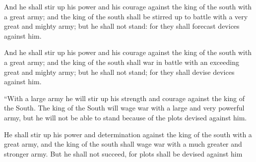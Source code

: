 			And he shall stir up his power and his courage against the king of the south with a great army; and the king of the south shall be stirred up to battle with a very great and mighty army; but he shall not stand: for they shall forecast devices against him.

			\begin{versebox}
					\item[BHS] 
					\item[LXX] 
					\item[ASV] And he shall stir up his power and his courage against the king of the south with a great army; and the king of the south shall war in battle with an exceeding great and mighty army; but he shall not stand; for they shall devise devices against him.
					\item[NIV] “With a large army he will stir up his strength and courage against the king of the South. The king of the South will wage war with a large and very powerful army, but he will not be able to stand because of the plots devised against him.
					\item[NRSV] He shall stir up his power and determination against the king of the south with a great army, and the king of the south shall wage war with a much greater and stronger army. But he shall not succeed, for plots shall be devised against him
			\end{versebox}

